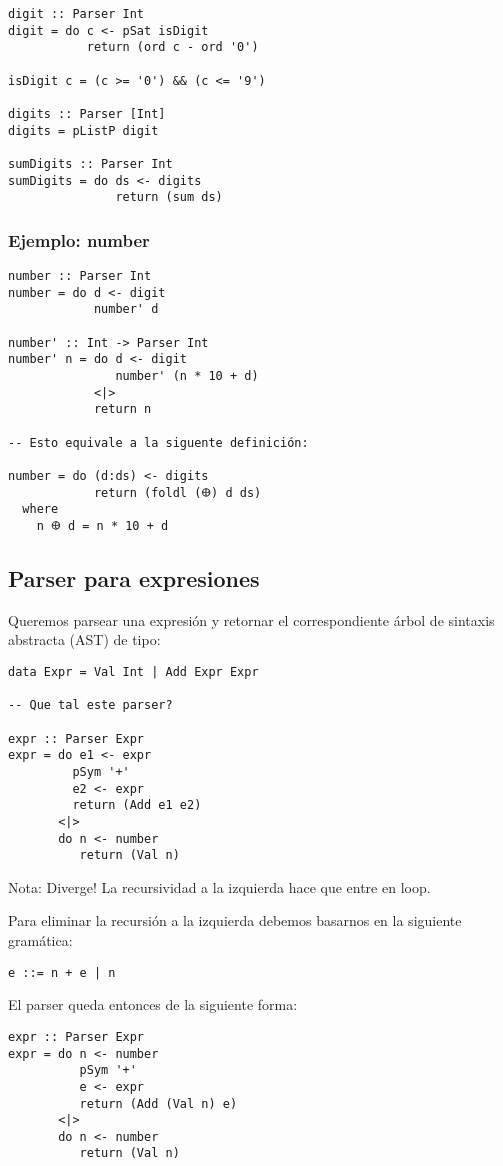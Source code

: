 \documentclass{article}
\newcommand{\imp}[1]{\textcolor{color1}{#1}}
\begin{document}
\begin{lstlisting}
digit :: Parser Int
digit = do c <- pSat isDigit
           return (ord c - ord '0')

isDigit c = (c >= '0') && (c <= '9')

digits :: Parser [Int]
digits = pListP digit

sumDigits :: Parser Int
sumDigits = do ds <- digits
               return (sum ds)
\end{lstlisting}

\subsubsection{Ejemplo: number}

\begin{lstlisting}
number :: Parser Int
number = do d <- digit
            number' d

number' :: Int -> Parser Int
number' n = do d <- digit
               number' (n * 10 + d)
            <|>
            return n

-- Esto equivale a la siguente definición:

number = do (d:ds) <- digits
            return (foldl (𐃏) d ds)
  where
    n 𐃏 d = n * 10 + d
\end{lstlisting}

\newpage

\subsection{Parser para expresiones}

Queremos parsear una expresión y retornar el correspondiente árbol
de sintaxis abstracta (AST) de tipo:

\begin{lstlisting}
data Expr = Val Int | Add Expr Expr

-- Que tal este parser?

expr :: Parser Expr
expr = do e1 <- expr
         pSym '+'
         e2 <- expr
         return (Add e1 e2)
       <|>
       do n <- number
          return (Val n)
\end{lstlisting}

\imp{Nota}: Diverge! La recursividad a la izquierda hace que entre en loop.

Para eliminar la recursión a la izquierda debemos basarnos en la
siguiente gramática:
\begin{center}
\texttt{e ::= n + e | n}
\end{center}
\indent \indent El parser queda entonces de la siguiente forma:
\begin{lstlisting}
expr :: Parser Expr
expr = do n <- number
          pSym '+'
          e <- expr
          return (Add (Val n) e)
       <|>
       do n <- number
          return (Val n)
\end{lstlisting}
\end{document}
